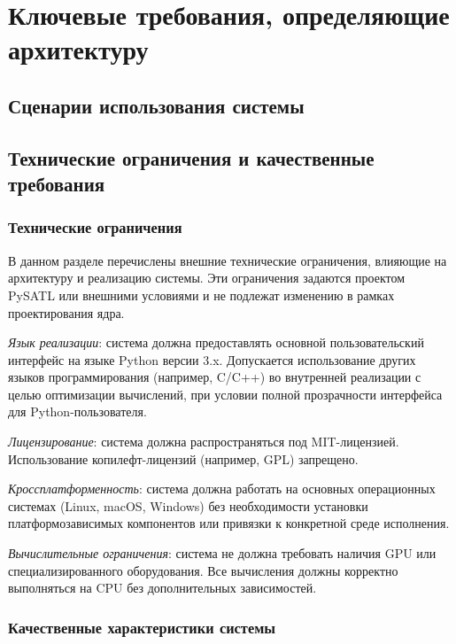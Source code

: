 \chapter{Ключевые требования, определяющие архитектуру}

\section{Сценарии использования системы}


\section{Технические ограничения и качественные требования}
\subsection{Технические ограничения}
В данном разделе перечислены внешние технические ограничения, влияющие на архитектуру и реализацию системы. Эти ограничения задаются проектом PySATL или внешними условиями и не подлежат изменению в рамках проектирования ядра.

\begin{itemizecmp}
    \item \textit{Язык реализации}: система должна предоставлять основной пользовательский интерфейс на языке Python версии 3.x. Допускается использование других языков программирования (например, C/C++) во внутренней реализации с целью оптимизации вычислений, при условии полной прозрачности интерфейса для Python-пользователя.
    \item \textit{Лицензирование}: система должна распространяться под MIT-лицензией. Использование копилефт-лицензий (например, GPL) запрещено.
    \item \textit{Кроссплатформенность}: система должна работать на основных операционных системах (Linux, macOS, Windows) без необходимости установки платформозависимых компонентов или привязки к конкретной среде исполнения.
    \item \textit{Вычислительные ограничения}: система не должна требовать наличия GPU или специализированного оборудования. Все вычисления должны корректно выполняться на CPU без дополнительных зависимостей. 
\end{itemizecmp}

\subsection{Качественные характеристики системы}

